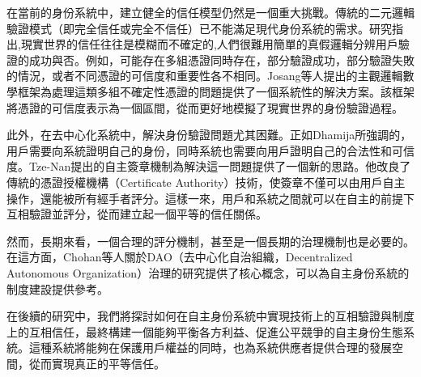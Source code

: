在當前的身份系統中，建立健全的信任模型仍然是一個重大挑戰。傳統的二元邏輯驗證模式（即完全信任或完全不信任）已不能滿足現代身份系統的需求。研究\cite{s22155641}指出,現實世界的信任往往是模糊而不確定的,人們很難用簡單的真假邏輯分辨用戶驗證的成功與否。例如，可能存在多組憑證同時存在，部分驗證成功，部分驗證失敗的情況，或者不同憑證的可信度和重要性各不相同。Josang等人\cite{josang2006exploring}提出的主觀邏輯數學框架為處理這類多組不確定性憑證的問題提供了一個系統性的解決方案。該框架將憑證的可信度表示為一個區間，從而更好地模擬了現實世界的身份驗證過程。

此外，在去中心化系統中，解決身份驗證問題尤其困難。正如Dhamija\cite{dhamija2008sevenflaws}所強調的，用戶需要向系統證明自己的身份，同時系統也需要向用戶證明自己的合法性和可信度。Tze-Nan\cite{NTU202102846}提出的自主簽章機制為解決這一問題提供了一個新的思路。他改良了傳統的憑證授權機構（Certificate Authority）技術，使簽章不僅可以由用戶自主操作，還能被所有經手者評分。這樣一來，用戶和系統之間就可以在自主的前提下互相驗證並評分，從而建立起一個平等的信任關係。

然而，長期來看，一個合理的評分機制，甚至是一個長期的治理機制也是必要的。在這方面，Chohan等人\cite{chohan2024decentralized}關於DAO（去中心化自治組織，Decentralized Autonomous Organization）治理的研究提供了核心概念，可以為自主身份系統的制度建設提供參考。

在後續的研究中，我們將探討如何在自主身份系統中實現技術上的互相驗證與制度上的互相信任，最終構建一個能夠平衡各方利益、促進公平競爭的自主身份生態系統。這種系統將能夠在保護用戶權益的同時，也為系統供應者提供合理的發展空間，從而實現真正的平等信任。
